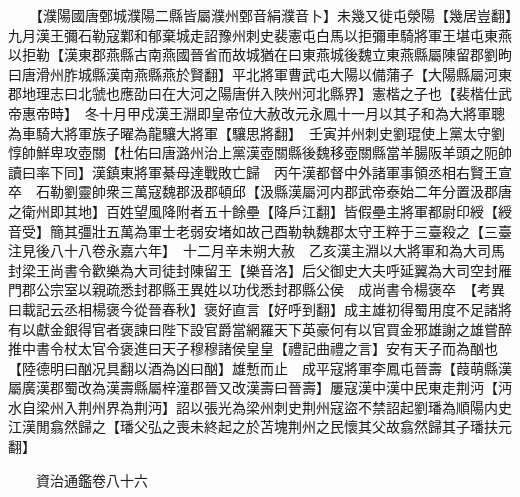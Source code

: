 　　【濮陽國唐鄄城濮陽二縣皆屬濮州鄄音絹濮音卜】未幾又徙屯滎陽【幾居豈翻】　九月漢王彌石勒寇鄴和郁棄城走詔豫州刺史裴憲屯白馬以拒彌車騎將軍王堪屯東燕以拒勒【漢東郡燕縣古南燕國晉省而故城猶在曰東燕城後魏立東燕縣屬陳留郡劉昫曰唐滑州胙城縣漢南燕縣燕於賢翻】平北將軍曹武屯大陽以備蒲子【大陽縣屬河東郡地理志曰北虢也應劭曰在大河之陽唐倂入陜州河北縣界】憲楷之子也【裴楷仕武帝惠帝時】　冬十月甲戍漢王淵即皇帝位大赦改元永鳳十一月以其子和為大將軍聰為車騎大將軍族子曜為龍驤大將軍【驤思將翻】　壬寅并州刺史劉琨使上黨太守劉惇帥鮮卑攻壺關【杜佑曰唐潞州治上黨漢壺關縣後魏移壺關縣當羊腸阪羊頭之阨帥讀曰率下同】漢鎮東將軍綦母達戰敗亡歸　丙午漢都督中外諸軍事領丞相右賢王宣卒　石勒劉靈帥衆三萬寇魏郡汲郡頓邱【汲縣漢屬河内郡武帝泰始二年分置汲郡唐之衛州即其地】百姓望風降附者五十餘壘【降戶江翻】皆假壘主將軍都尉印綬【綬音受】簡其彊壯五萬為軍士老弱安堵如故己酉勒執魏郡太守王粹于三臺殺之【三臺注見後八十八卷永嘉六年】　十二月辛未朔大赦　乙亥漢主淵以大將軍和為大司馬封梁王尚書令歡樂為大司徒封陳留王【樂音洛】后父御史大夫呼延翼為大司空封雁門郡公宗室以親疏悉封郡縣王異姓以功伐悉封郡縣公侯　成尚書令楊褒卒　【考異曰載記云丞相楊褒今從晉春秋】褒好直言【好呼到翻】成主雄初得蜀用度不足諸將有以獻金銀得官者褒諫曰陛下設官爵當網羅天下英豪何有以官買金邪雄謝之雄嘗醉推中書令杖太官令褒進曰天子穆穆諸侯皇皇【禮記曲禮之言】安有天子而為酗也【陸德明曰酗况具翻以酒為凶曰酗】雄慙而止　成平寇將軍李鳳屯晉壽【葭萌縣漢屬廣漢郡蜀改為漢壽縣屬梓潼郡晉又改漢壽曰晉壽】屢寇漢中漢中民東走荆沔【沔水自梁州入荆州界為荆沔】詔以張光為梁州刺史荆州寇盜不禁詔起劉璠為順陽内史江漢閒翕然歸之【璠父弘之喪未終起之於苫塊荆州之民懷其父故翕然歸其子璠扶元翻】

　　資治通鑑卷八十六  
    


 


 



 

 
  







 


　　
　　
　
　
　


　　

　















